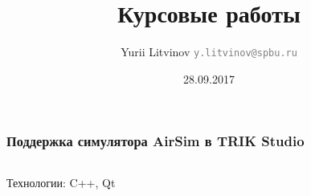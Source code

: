 \documentclass[xetex,mathserif,serif]{beamer}
\title{Курсовые работы}
\author[Юрий Литвинов]{Yurii Litvinov \newline 
	\textcolor{gray}{\small\texttt{y.litvinov@spbu.ru}}
}
\date{28.09.2017}
\begin{document}
	
	\begin{frame}
		\frametitle{Поддержка симулятора AirSim в TRIK Studio}
		\begin{columns}
			\begin{column}{0.5\textwidth}

				\footnotesize{}
			\end{column}
			\begin{column}{0.5\textwidth}

				\footnotesize{}
			\end{column}
		\end{columns}
		\vspace{0.7cm}
		Технологии: C++, Qt
	\end{frame}
\end{document}
